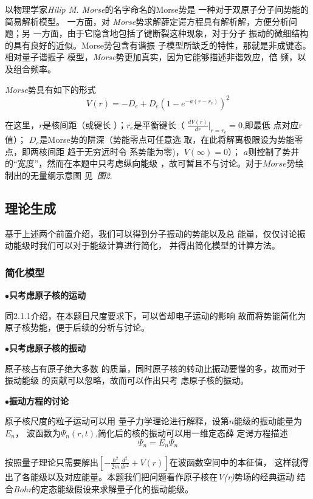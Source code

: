\documentclass[11pt, a4paper, oneside]{ctexart}
\begin{document}
{{
    以物理学家\emph{Hilip M. Morse}的名字命名的Morse势是
    一种对于双原子分子间势能的简易解析模型。 一方面，对
    \emph{Morse}势求解薛定谔方程具有解析解，方便分析问题；另
    一方面，由于它隐含地包括了键断裂这种现象，对于分子
    振动的微细结构的具有良好的近似。Morse势包含有谐振
    子模型所缺乏的特性，那就是非成键态。相对量子谐振子
    模型，\emph{Morse}势更加真实，因为它能够描述非谐效应，倍
    频，以及组合频率。

    \emph{Morse}势具有如下的形式
\begin{equation}
    {V(r)=-D_{e}+D_{e}(1-e^{-a(r-r_{e})})^{2}}
\end{equation}


{在这里，$r$是核间距（或键长
）；$r_e$是平衡键长（
{$\frac{dV(r)}{dr}|_{r=r_{e}}=0$},即最低
点对应r值）；
{$D_{e}$}是Morse势的阱深（势能零点可任意选
取，在此将解离极限设为势能零点，即两核间距
趋于无穷远时令
系势能为零)，{$V(\infty )=0$}）；
{$a$}则控制了势井的“宽度”，然而在本题中只考虑纵向能级
，故可暂且不与讨论。对于$Morse$势绘制出的无量纲示意图
见\ \emph{图2}.
}


\subsection{理论生成}
{基于上述两个前置介绍，我们可以得到分子振动的势能以及总
能量，仅仅讨论振动能级时我们可以对于能级计算进行简化，
并得出简化模型的计算方法。}
\subsubsection{简化模型}
{
$\bullet${\bfseries{只考虑原子核的运动}}

{\setlength{\parindent}{3em}同2.1.1介绍，在本题目尺度要求下，可以省却电子运动的影响
故而将势能简化为原子核势能，便于后续的分析与讨论。}

$\bullet${\bfseries{只考虑原子核的振动}}

{\setlength{\parindent}{3em}原子核占有原子绝大多数
的质量，同时原子核的转动比振动要慢的多，故而对于振动能级
的贡献可以忽略，故而可以作出只考
虑原子核的振动。}

$\bullet${\bfseries{振动方程的讨论}}

{\setlength{\parindent}{3em}原子核尺度的粒子运动可以用
量子力学理论进行解释，设第$n$能级的振动能量为$E_n$，
波函数为$\Psi_n(r,t)$,简化后的核的振动可以用一维定态薛
定谔方程描述
\begin{equation}
	[-\frac{\hbar^2}{2m}\frac{d^2}{dr^2}+V(r)]\Psi_n=E_n\Psi_n
\end{equation}
\par 按照量子理论只需要解出$[-\frac{\hbar^2}{2m}\frac{d^2}{dr^2}+V(r)]$在波函数空间中的本征值，
这样就得出了各能级以及对应能量。本题我们把问题看作原子核在\emph{V(r)}势场的经典运动
结合\emph{Bohr}的定态能级假设来求解量子化的振动能级。
}

}}}
\end{document}
